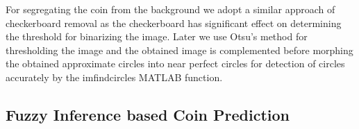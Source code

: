 \documentclass[report.tex]{subfile}
\begin{document}
For segregating the coin from the background we adopt a similar approach of checkerboard removal as the checkerboard has significant effect on determining the threshold for binarizing the image. Later we use Otsu's method for thresholding the image and the obtained image is complemented before morphing the obtained approximate circles into near perfect circles for detection of circles accurately by the imfindcircles MATLAB function.

\subsection{Fuzzy Inference based Coin Prediction}
\end{document}
